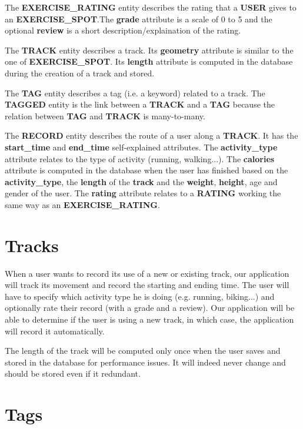 \documentclass[a4paper]{article}
\begin{document}
The \textbf{EXERCISE\_RATING} entity describes the rating that a \textbf{USER} gives to an \textbf{EXERCISE\_SPOT}.The \textbf{grade} attribute is a scale of 0 to 5 and the optional \textbf{review} is a short description/explaination of the rating.

The \textbf{TRACK} entity describes a track. Its \textbf{geometry} attribute is similar to the one of \textbf{EXERCISE\_SPOT}. Its \textbf{length} attribute is computed in the database during the creation of a track and stored.

The \textbf{TAG} entity describes a tag (i.e. a keyword) related to a track. The \textbf{TAGGED} entity is the link between a \textbf{TRACK} and a \textbf{TAG} because the relation between \textbf{TAG} and \textbf{TRACK} is many-to-many.

The \textbf{RECORD} entity describes the route of a user along a \textbf{TRACK}. It has the \textbf{start\_time} and \textbf{end\_time} self-explained attributes. The \textbf{activity\_type} attribute relates to the type of activity (running, walking...). The \textbf{calories} attribute is computed in the database when the user has finished based on the \textbf{activity\_type}, the \textbf{length} of the \textbf{track} and the \textbf{weight}, \textbf{height}, age and gender of the user. The \textbf{rating} attribute relates to a \textbf{RATING} working the same way as an \textbf{EXERCISE\_RATING}.

\section{Tracks}

When a user wants to record its use of a new or existing track, our application will track its movement and record the starting and ending time. The user will have to specify which activity type he is doing (e.g. running, biking...) and optionally rate their record (with a grade and a review). Our application will be able to determine if the user is using a new track, in which case, the application will record it automatically.

The length of the track will be computed only once when the user saves and stored in the database for performance issues. It will indeed never change and should be stored even if it redundant.

\section{Tags}
\end{document}
